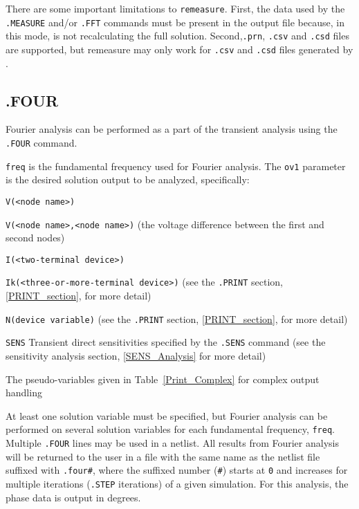 {{There are some important limitations to \texttt{remeasure}.  First, the data used by the
\texttt{.MEASURE} and/or \texttt{.FFT} commands must be present in the output file because,
in this mode, \Xyce{} is not recalculating the full solution.  Second,\texttt{.prn},
\texttt{.csv} and \texttt{.csd} files are supported, but remeasure may only
work for \texttt{.csv} and \texttt{.csd} files generated by \Xyce{}.


\subsection{.FOUR}
Fourier analysis can be performed as a part of the transient analysis using
the \texttt{.FOUR} command.


\texttt{freq} is the fundamental frequency used for Fourier analysis.
The \texttt{ov1} parameter is the desired solution output to be analyzed, specifically:
\begin{XyceItemize}
\item \texttt{V(<node name>)}
\item \texttt{V(<node name>,<node name>)} (the voltage difference between the first and second nodes)
\item \texttt{I(<two-terminal device>)}
\item \texttt{Ik(<three-or-more-terminal device>)} (see the \texttt{.PRINT} section, \ref{PRINT_section}, for more detail)
\item \texttt{N(device variable)} (see the \texttt{.PRINT} section, \ref{PRINT_section}, for more detail)
\item \texttt{SENS} Transient direct sensitivities specified by the \texttt{.SENS} command  (see the sensitivity analysis section, \ref{SENS_Analysis} for more detail)
\item The pseudo-variables given in Table~\ref{Print_Complex} for complex output handling
\end{XyceItemize}
At least one solution variable must be specified, but
Fourier analysis can be performed on several solution variables for each 
fundamental frequency, \texttt{freq}.
Multiple \texttt{.FOUR} lines may be used in a netlist.  
All results from Fourier analysis will be returned to the user in a file 
with the same name as the netlist file suffixed with \texttt{.four\#}, where
the suffixed number (\texttt{\#}) starts at \texttt{0} and increases for multiple
iterations (\texttt{.STEP} iterations) of a given simulation.
For this analysis, the phase data is output in degrees.

}}
